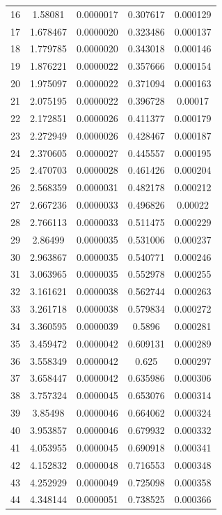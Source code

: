 \begin{table}[h]
{\begin{tabular}{ccccc}
16 & 1.58081  & 0.0000017  & 0.307617 & 0.000129 \\
17 & 1.678467 & 0.0000020  & 0.323486 & 0.000137 \\
18 & 1.779785 & 0.0000020  & 0.343018 & 0.000146 \\
19 & 1.876221 & 0.0000022  & 0.357666 & 0.000154 \\
20 & 1.975097 & 0.0000022  & 0.371094 & 0.000163 \\
21 & 2.075195 & 0.0000022  & 0.396728 & 0.00017  \\
22 & 2.172851 & 0.0000026  & 0.411377 & 0.000179 \\
23 & 2.272949 & 0.0000026  & 0.428467 & 0.000187 \\
24 & 2.370605 & 0.0000027  & 0.445557 & 0.000195 \\
25 & 2.470703 & 0.0000028  & 0.461426 & 0.000204 \\
26 & 2.568359 & 0.0000031  & 0.482178 & 0.000212 \\
27 & 2.667236 & 0.0000033  & 0.496826 & 0.00022  \\
28 & 2.766113 & 0.0000033  & 0.511475 & 0.000229 \\
29 & 2.86499  & 0.0000035  & 0.531006 & 0.000237 \\
30 & 2.963867 & 0.0000035  & 0.540771 & 0.000246 \\
31 & 3.063965 & 0.0000035  & 0.552978 & 0.000255 \\
32 & 3.161621 & 0.0000038  & 0.562744 & 0.000263 \\
33 & 3.261718 & 0.0000038  & 0.579834 & 0.000272 \\
34 & 3.360595 & 0.0000039  & 0.5896   & 0.000281 \\
35 & 3.459472 & 0.0000042  & 0.609131 & 0.000289 \\
36 & 3.558349 & 0.0000042  & 0.625    & 0.000297 \\
37 & 3.658447 & 0.0000042  & 0.635986 & 0.000306 \\
38 & 3.757324 & 0.0000045  & 0.653076 & 0.000314 \\
39 & 3.85498  & 0.0000046  & 0.664062 & 0.000324 \\
40 & 3.953857 & 0.0000046  & 0.679932 & 0.000332 \\
41 & 4.053955 & 0.0000045  & 0.690918 & 0.000341 \\
42 & 4.152832 & 0.0000048  & 0.716553 & 0.000348 \\
43 & 4.252929 & 0.0000049  & 0.725098 & 0.000358 \\
44 & 4.348144 & 0.0000051  & 0.738525 & 0.000366 \\

\end{tabular}}
\end{table}
